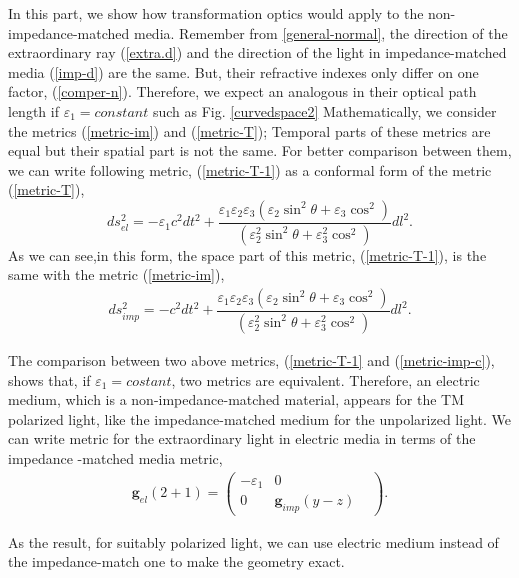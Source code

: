\documentclass[9pt,twocolumn,twoside]{osajnl}
\begin{document}
In this part, we show how transformation optics would apply to the non-impedance-matched media. Remember from \ref{general-normal}, the direction of the extraordinary ray (\ref{extra.d}) and the direction of the light in impedance-matched media (\ref{imp-d}) are the same. But, their refractive indexes only differ on one factor, (\ref{comper-n}). Therefore, we expect an analogous in their optical path length if $\varepsilon_{1}=constant$ such as Fig. \ref{curvedspace2}  Mathematically, we consider the metrics (\ref{metric-im}) and (\ref{metric-T}); Temporal parts of these metrics are equal but their spatial part is not the same. For better comparison between them, we can write following metric, (\ref{metric-T-1}) as a conformal form of the metric (\ref{metric-T}), 
\begin{equation}\label{metric-T-1}
ds_{el}^{2}=- \varepsilon_{1}c^{2}dt^{2}+\dfrac{\varepsilon_{1}\varepsilon_{2}\varepsilon_{3}\left({\varepsilon_{2} \sin^{2}{\theta} + \varepsilon_{3}\cos^{2}}\right)}{\left({\varepsilon_{2}^{2} \sin^{2}{\theta} + \varepsilon_{3}^{2}\cos^{2}}\right)}dl^{2}.
\end{equation}
As we can see,in this form, the space part of this metric, (\ref{metric-T-1}), is the same with the metric (\ref{metric-im}),
\begin{align}\label{metric-imp-c}
ds_{imp}^{2}=- c^{2}dt^{2}+\dfrac{\varepsilon_{1}\varepsilon_{2}\varepsilon_{3}\left({\varepsilon_{2} \sin^{2}{\theta} + \varepsilon_{3}\cos^{2}}\right)}{\left({\varepsilon_{2}^{2} \sin^{2}{\theta} + \varepsilon_{3}^{2}\cos^{2}}\right)}dl^{2}.
\end{align}

 The comparison between two above metrics, (\ref{metric-T-1} and (\ref{metric-imp-c}),  shows that, if $\varepsilon_1=costant$,  two metrics are equivalent. Therefore, an electric medium, which is a non-impedance-matched material, appears for the TM polarized light, like the impedance-matched medium for the unpolarized light. We can write metric for the extraordinary light in electric media in terms of the impedance -matched media metric,
 \begin{align}
\mathbf{g}_{el}(2+1)=
\begin{pmatrix}
-\varepsilon_{1}&0&\\
0&\mathbf{g}_{imp}(y-z)
\end{pmatrix}.
\end{align}

 As the result, for suitably polarized light, we can use electric medium instead of the impedance-match one to make the geometry exact.
 
\end{document}
